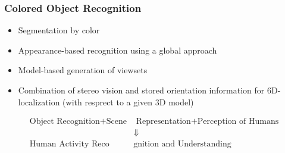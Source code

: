\subsubsection{Colored Object Recognition}
\begin{itemize}
	\item Segmentation by color
	\item Appearance-based recognition using a global approach
	\item Model-based generation of viewsets
	\item Combination of stereo vision and stored orientation information for 6D-localization (with resprect to a given 3D model)
\end{itemize}
\begin{align*}
	\text{Object Recognition} + \text{Scene} & \text{ Representation} + \text{Perception of Humans} \\
	& \Downarrow \\ \text{Human Activity Reco} & \text{gnition and Understanding}
\end{align*}



